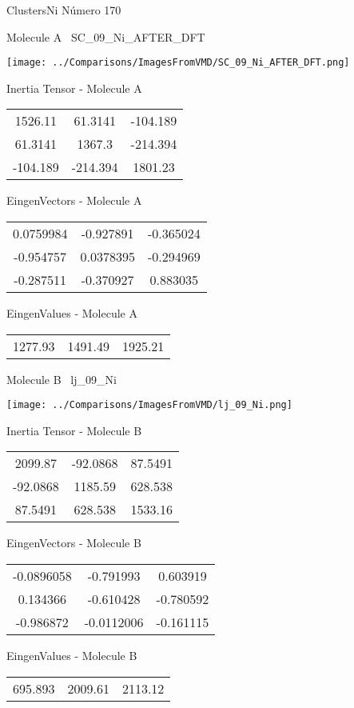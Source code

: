 \vtab[-3cm]
\begin{center}
{\large ClustersNi \tab Número 170}
\end{center}
\begin{multicols}{2}
\begin{center}

Molecule A \
SC\_09\_Ni\_AFTER\_DFT

\texttt{[image: ../Comparisons/ImagesFromVMD/SC\_09\_Ni\_AFTER\_DFT.png]}

Inertia Tensor - Molecule A \\
\begin{tabular}{|c c c|}
1526.11	 & 	61.3141	 & 	-104.189	 \\
61.3141	 & 	1367.3	 & 	-214.394	 \\
-104.189	 & 	-214.394	 & 	1801.23
\end{tabular}

\vtab
 EingenVectors - Molecule A     \\
\begin{tabular}{|c c c|}
0.0759984	 & 	-0.927891	 & 	-0.365024	 \\
-0.954757	 & 	0.0378395	 & 	-0.294969	 \\
-0.287511	 & 	-0.370927	 & 	0.883035
\end{tabular}

\vtab
 EingenValues - Molecule A     \\
\begin{tabular}{|c c c|}
1277.93	 & 	1491.49	 & 	1925.21	 \\
\end{tabular}
\columnbreak

Molecule B \
lj\_09\_Ni

\texttt{[image: ../Comparisons/ImagesFromVMD/lj\_09\_Ni.png]}

Inertia Tensor - Molecule B \\
\begin{tabular}{|c c c|}
2099.87	 & 	-92.0868	 & 	87.5491	 \\
-92.0868	 & 	1185.59	 & 	628.538	 \\
87.5491	 & 	628.538	 & 	1533.16
\end{tabular}

\vtab
 EingenVectors - Molecule B     \\
\begin{tabular}{|c c c|}
-0.0896058	 & 	-0.791993	 & 	0.603919	 \\
0.134366	 & 	-0.610428	 & 	-0.780592	 \\
-0.986872	 & 	-0.0112006	 & 	-0.161115
\end{tabular}

\vtab
 EingenValues - Molecule B     \\
\begin{tabular}{|c c c|}
695.893	 & 	2009.61	 & 	2113.12	 \\
\end{tabular}

\end{center}
\end{multicols}


